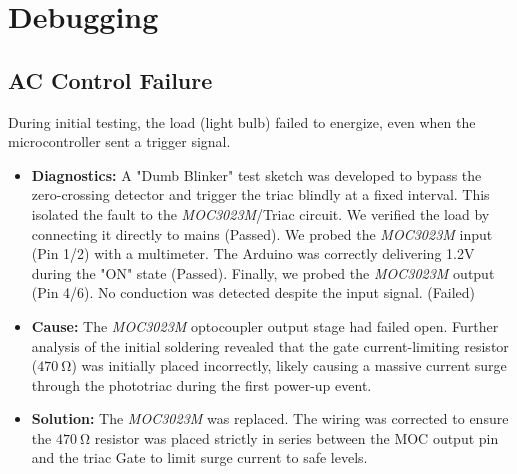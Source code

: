 \documentclass[11pt]{article}
\begin{document}
\section{Debugging}
\subsection{AC Control Failure}
During initial testing, the load (light bulb) failed to energize, even when the microcontroller sent a trigger signal.
\begin{itemize}
	\item{\textbf{Diagnostics:}} 
		A "Dumb Blinker" test sketch was developed to bypass the zero-crossing detector and trigger the triac blindly at a fixed interval. This isolated the fault to the \emph{MOC3023M}/Triac circuit.
		We verified the load by connecting it directly to mains (Passed). We probed the \emph{MOC3023M} input (Pin 1/2) with a multimeter. The Arduino was correctly delivering 1.2V during the "ON" state (Passed). Finally, we probed the \emph{MOC3023M} output (Pin 4/6). No conduction was detected despite the input signal. (Failed)
	\item{\textbf{Cause:}}
		The \emph{MOC3023M} optocoupler output stage had failed open. Further analysis of the initial soldering revealed that the gate current-limiting resistor ($\SI{470}{\ohm}$) was initially placed incorrectly, likely causing a massive current surge through the phototriac during the first power-up event.
	\item{\textbf{Solution:}}
		The \emph{MOC3023M} was replaced. The wiring was corrected to ensure the $\SI{470}{\ohm}$ resistor was placed strictly in series between the MOC output pin and the triac Gate to limit surge current to safe levels.
\end{itemize}
\end{document}
